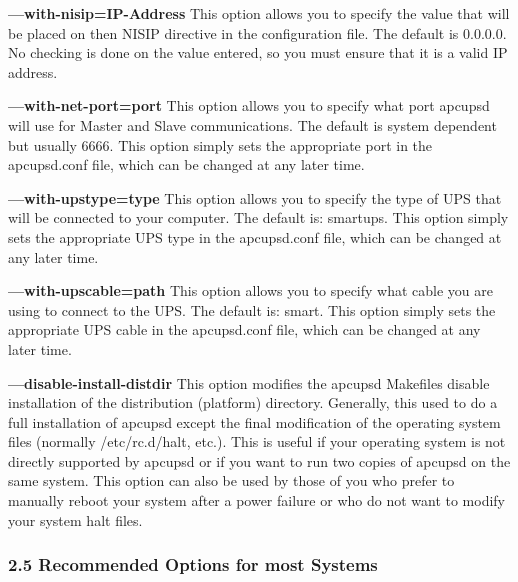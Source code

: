 \begin{description}
\item {\bf {---}with-nisip=\lt{}IP-Address\gt{}}
This option allows you to specify the value that will be placed on then NISIP
directive in the configuration file. The default is 0.0.0.0. No checking is
done on the value entered, so you must ensure that it is a valid IP address.  

\item {\bf {---}with-net-port=\lt{}port\gt{}}
This option allows you to specify what port apcupsd will use for Master and
Slave communications. The default is system dependent but usually 6666. This
option simply sets the appropriate port in the apcupsd.conf file, which can be
changed at any later time.  

\item {\bf {---}with-upstype=\lt{}type\gt{}}
This option allows you to specify the type of UPS that will be connected to
your computer. The default is: smartups. This option simply sets the
appropriate UPS type in the apcupsd.conf file, which can be changed at any
later time.  

\item {\bf {---}with-upscable=\lt{}path\gt{}}
This option allows you to specify what cable you are using to connect to the
UPS. The default is: smart. This option simply sets the appropriate UPS cable
in the apcupsd.conf file, which can be changed at any later time.  

\item {\bf {---}disable-install-distdir}
This option modifies the apcupsd Makefiles disable installation of the
distribution (platform) directory. Generally, this used to do a full
installation of apcupsd except the final modification of the operating system
files (normally /etc/rc.d/halt, etc.). This is useful if your operating system
is not directly supported by apcupsd or if you want to run two copies of
apcupsd on the same system. This option can also be used by those of you who
prefer to manually reboot your system after a power failure or who do not want
to modify your system halt files. 
\end{description}

\label{Recommended-Options-for-most-Systems}

\subsubsection*{2.5 Recommended Options for most Systems}

